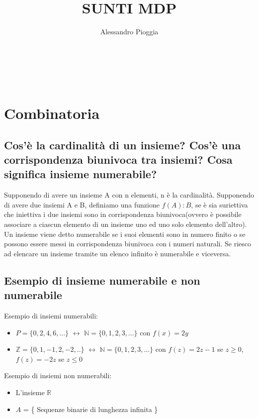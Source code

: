 \documentclass[a4paper,12pt]{report}
\title{\textbf{SUNTI MDP}}
\author{Alessandro Pioggia}
\begin{document}
	
	\makeatletter
	\begin{titlepage}
		\begin{center}
			{\Huge  \@title }\\[3ex] 
			{\large  \@author}\\[3ex] 
			{\large \@date}
		\end{center}
	\end{titlepage}
	\makeatother
	\thispagestyle{empty}
	\newpage
	
	
	\tableofcontents
	
	
		
	\newpage
	
	\section{Combinatoria}
	\subsection{Cos'è la cardinalità di un insieme? Cos'è una corrispondenza biunivoca tra insiemi? Cosa significa insieme numerabile?}
	Supponendo di avere un insieme A con n elementi, n è la cardinalità. 
	Supponendo di avere due insiemi A e B, definiamo una funzione $f(A) : B$, se  è sia suriettiva che iniettiva i due insiemi sono in corrispondenza biunivoca(ovvero è possibile associare a ciascun elemento di un insieme uno ed uno solo elemento dell'altro).
	Un insieme viene detto numerabile se i suoi elementi sono in numero finito o se  possono essere messi in corrispondenza biunivoca con i numeri naturali. Se riesco ad elencare un insieme tramite un elenco infinito è numerabile e viceversa.
	\subsection{Esempio di insieme numerabile e non numerabile}
	Esempio di insiemi numerabili: 
	\begin{itemize}
		\item $P = \{0, 2, 4, 6, ...\}$ $\leftrightarrow$ $\mathbb{N} = \{0, 1, 2, 3, ...\}$ con $f(x) = 2y$
		\item $\mathbb{Z} = \{0, 1, -1, 2, -2, ..\}$ $\leftrightarrow$ $\mathbb{N} = \{0, 1, 2, 3, ...\}$ con $f(z) = 2z - 1$ se $z \ge 0$, $f(z) = -2z$ se $z \leq 0$
	\end{itemize}
	Esempio di insiemi non numerabili:
	\begin{itemize}
		\item L'insieme $\mathbb{R}$
		\item $A$ = \{ Sequenze binarie di lunghezza infinita \}
	\end{itemize}
\end{document}
